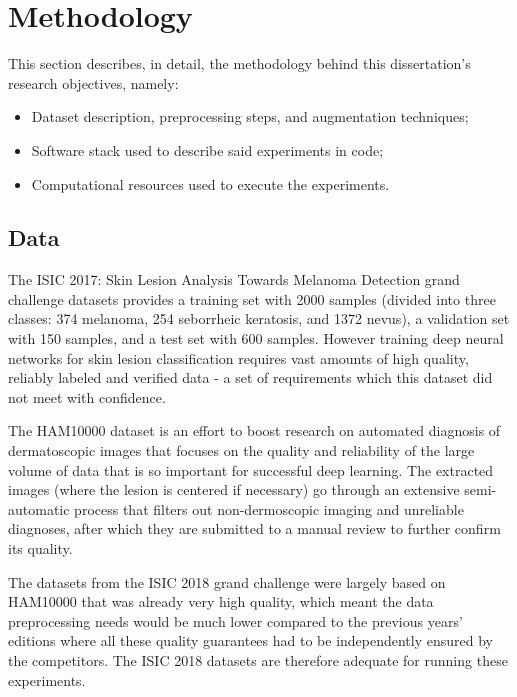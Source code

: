 \chapter{Methodology}
\label{chapter:methodology}

This section describes, in detail, the methodology behind this dissertation's research objectives, namely:

\begin{itemize}
    \item Dataset description, preprocessing steps, and augmentation techniques;
    \item Software stack used to describe said experiments in code;
    \item Computational resources used to execute the experiments.
\end{itemize}

\section{Data}

The \ac{ISIC} 2017: Skin Lesion Analysis Towards Melanoma Detection grand challenge datasets \cite{isic2017} provides a training set with 2000 samples (divided into three classes: 374 melanoma, 254 seborrheic keratosis, and 1372 nevus), a validation set with 150 samples, and a test set with 600 samples. However training deep neural networks for skin lesion classification requires vast amounts of high quality, reliably labeled and verified data - a set of requirements which this dataset did not meet with confidence.

The \ac{HAM10000} \cite{ham10000} dataset is an effort to boost research on automated diagnosis of dermatoscopic images that focuses on the quality and reliability of the large volume of data that is so important for successful deep learning. The extracted images (where the lesion is centered if necessary) go through an extensive semi-automatic process that filters out non-dermoscopic imaging and unreliable diagnoses, after which they are submitted to a manual review to further confirm its quality.

The datasets from the \ac{ISIC} 2018 grand challenge \cite{isic2018} were largely based on \ac{HAM10000} that was already very high quality, which meant the data preprocessing needs would be much lower compared to the previous years' editions where all these quality guarantees had to be independently ensured by the competitors. The \ac{ISIC} 2018 datasets are therefore adequate for running these experiments.

